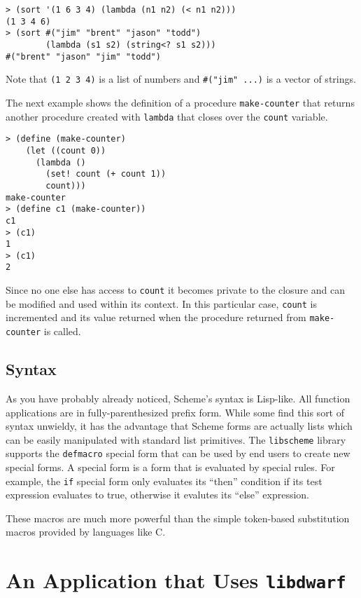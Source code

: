 \begin{verbatim}
> (sort '(1 6 3 4) (lambda (n1 n2) (< n1 n2)))
(1 3 4 6)
> (sort #("jim" "brent" "jason" "todd") 
        (lambda (s1 s2) (string<? s1 s2)))
#("brent" "jason" "jim" "todd")
\end{verbatim}

Note that \verb+(1 2 3 4)+ is a list of numbers and 
\verb+#("jim" ...)+ is a vector of strings.

The next example shows the definition of a procedure
\verb+make-counter+ that returns another procedure created with
\verb+lambda+ that closes over the \verb+count+ variable.  

\begin{verbatim}
> (define (make-counter)
    (let ((count 0))
      (lambda ()
        (set! count (+ count 1))
        count)))
make-counter
> (define c1 (make-counter))
c1
> (c1)
1
> (c1)
2
\end{verbatim}

Since no one else has access to \verb+count+ it becomes private to the
closure and can be modified and used within its context.  In this
particular case, \verb+count+ is incremented and its value returned
when the procedure returned from \verb+make-counter+ is called.

\subsection{Syntax}

As you have probably already noticed, Scheme's syntax is Lisp-like.
All function applications are in fully-parenthesized prefix form.
While some find this sort of syntax unwieldy, it has the advantage
that Scheme forms are actually lists which can be easily manipulated
with standard list primitives.  The \verb+libscheme+ library supports
the \verb+defmacro+ special form that can be used by end users to
create new special forms.  A special form is a form that is evaluated
by special rules.  For example, the \verb+if+ special form only
evaluates its ``then'' condition if its test expression evaluates to
true, otherwise it evalutes its ``else'' expression.

These macros are much more powerful than the simple token-based
substitution macros provided by languages like C.

\section{An Application that Uses {\tt libdwarf}}


